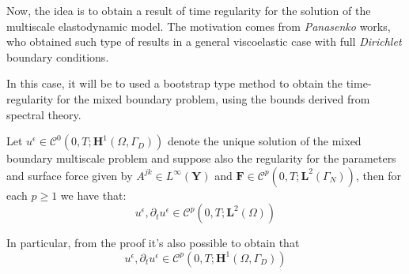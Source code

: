 
Now, the idea is to obtain a result of time regularity for the solution of the multiscale elastodynamic model. The motivation comes from \textit{Panasenko} works, who obtained such type of results in a general viscoelastic case with full \textit{Dirichlet} boundary conditions.

In this case, it will be to used a bootstrap type method to obtain the time-regularity for the mixed boundary problem, using the bounds derived from spectral theory.

\begin{prop}
\label{BootstrapingProp}
Let $u^{\epsilon} \in \mathcal{C}^{0}(0,T; \mathbf{H}^1(\Omega, \Gamma_D))$ denote the unique solution of the mixed boundary multiscale problem and suppose also the regularity for the parameters and surface force given by $A^{jk} \in L^{\infty}(\mathbf{Y})$ and $\mathbf{F} \in \mathcal{C}^p(0,T; \mathbf{L}^{2}(\Gamma_N))$, then for each $p \geq 1$ we have that:
\begin{equation*}
    u^{\epsilon}, \partial_t u^{\epsilon} \in \mathcal{C}^p(0,T; \mathbf{L}^2(\Omega))
\end{equation*}
\end{prop}
\begin{rem}
In particular, from the proof it's also possible to obtain that
\begin{equation*}
    u^{\epsilon}, \partial_t u^{\epsilon} \in \mathcal{C}^p(0,T; \mathbf{H}^1(\Omega, \Gamma_D))
\end{equation*}
\end{rem}

